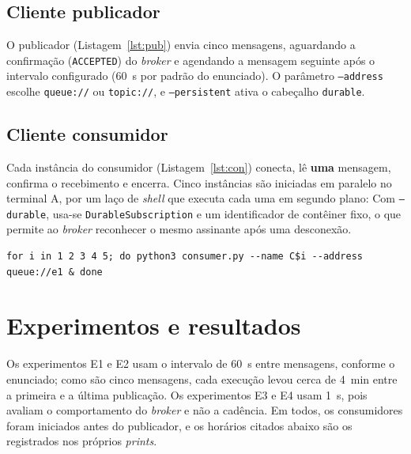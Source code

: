\documentclass[12pt,a4paper]{article}
\begin{document}


\subsection{Cliente publicador}
O publicador (Listagem~\ref{lst:pub}) envia cinco mensagens, aguardando a confirmação (\texttt{ACCEPTED}) do \textit{broker} e agendando a mensagem seguinte após o intervalo configurado (60~s por padrão do enunciado). O parâmetro \texttt{--address} escolhe \texttt{queue://} ou \texttt{topic://}, e \texttt{--persistent} ativa o cabeçalho \texttt{durable}.



\subsection{Cliente consumidor}
Cada instância do consumidor (Listagem~\ref{lst:con}) conecta, lê \textbf{uma} mensagem, confirma o recebimento e encerra. Cinco instâncias são iniciadas em paralelo no terminal A, por um laço de \textit{shell} que executa cada uma em segundo plano: Com \texttt{--durable}, usa-se \texttt{DurableSubscription} e um identificador de contêiner fixo, o que permite ao \textit{broker} reconhecer o mesmo assinante após uma desconexão.

\begin{lstlisting}[language={},numbers=none]
for i in 1 2 3 4 5; do python3 consumer.py --name C$i --address queue://e1 & done
\end{lstlisting}



\section{Experimentos e resultados}\label{sec:exp}
Os experimentos E1 e E2 usam o intervalo de 60~s entre mensagens, conforme o enunciado; como são cinco mensagens, cada execução levou cerca de 4~min entre a primeira e a última publicação. Os experimentos E3 e E4 usam 1~s, pois avaliam o comportamento do \textit{broker} e não a cadência. Em todos, os consumidores foram iniciados antes do publicador, e os horários citados abaixo são os registrados nos próprios \textit{prints}.
\end{document}
